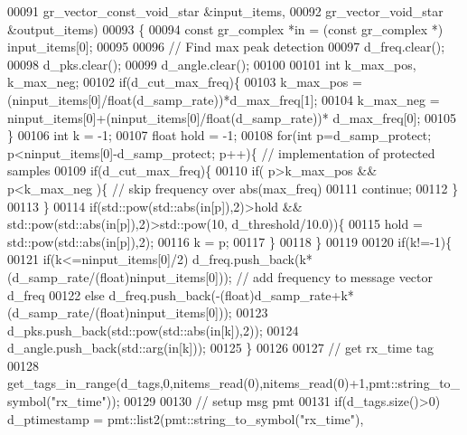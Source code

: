\begin{DoxyCode}
00091                        gr\_vector\_const\_void\_star &input\_items,
00092                        gr\_vector\_void\_star &output\_items)
00093     \{
00094         \textcolor{keyword}{const} gr\_complex *in = (\textcolor{keyword}{const} gr\_complex *) input\_items[0];
00095         
00096         \textcolor{comment}{// Find max peak detection}
00097         d_freq.clear();
00098         d_pks.clear();
00099         d_angle.clear();
00100         
00101         \textcolor{keywordtype}{int} k\_max\_pos, k\_max\_neg;
00102         \textcolor{keywordflow}{if}(d_cut_max_freq)\{
00103             k\_max\_pos = (ninput\_items[0]/float(d_samp_rate))*d_max_freq[1];
00104             k\_max\_neg = ninput\_items[0]+(ninput\_items[0]/float(d_samp_rate))*
      d_max_freq[0];
00105         \}
00106         \textcolor{keywordtype}{int} k = -1;
00107         \textcolor{keywordtype}{float} hold = -1;
00108         \textcolor{keywordflow}{for}(\textcolor{keywordtype}{int} p=d_samp_protect; p<ninput\_items[0]-d_samp_protect; p++)\{ \textcolor{comment}{// implementation of protected
       samples}
00109             \textcolor{keywordflow}{if}(d_cut_max_freq)\{
00110                 \textcolor{keywordflow}{if}( p>k\_max\_pos && p<k\_max\_neg )\{ \textcolor{comment}{// skip frequency over abs(max\_freq)}
00111                     \textcolor{keywordflow}{continue};
00112                 \}
00113             \}
00114             \textcolor{keywordflow}{if}(std::pow(std::abs(in[p]),2)>hold && std::pow(std::abs(in[p]),2)>std::pow(10,
      d_threshold/10.0))\{
00115                 hold = std::pow(std::abs(in[p]),2);
00116                 k = p;
00117             \}
00118         \}
00119         
00120         \textcolor{keywordflow}{if}(k!=-1)\{
00121             \textcolor{keywordflow}{if}(k<=ninput\_items[0]/2) d_freq.push\_back(k*(d_samp_rate/(\textcolor{keywordtype}{float})ninput\_items[0])); \textcolor{comment}{// add
       frequency to message vector d\_freq}
00122             \textcolor{keywordflow}{else} d_freq.push\_back(-(\textcolor{keywordtype}{float})d_samp_rate+k*(d_samp_rate/(\textcolor{keywordtype}{float})ninput\_items[0]));
00123             d_pks.push\_back(std::pow(std::abs(in[k]),2));
00124             d_angle.push\_back(std::arg(in[k]));
00125         \}
00126 
00127         \textcolor{comment}{// get rx\_time tag}
00128         get\_tags\_in\_range(d_tags,0,nitems\_read(0),nitems\_read(0)+1,pmt::string\_to\_symbol(\textcolor{stringliteral}{"rx\_time"}));
00129         
00130         \textcolor{comment}{// setup msg pmt}
00131         \textcolor{keywordflow}{if}(d_tags.size()>0) d_ptimestamp = pmt::list2(pmt::string\_to\_symbol(\textcolor{stringliteral}{"rx\_time"}),

\end{DoxyCode}
